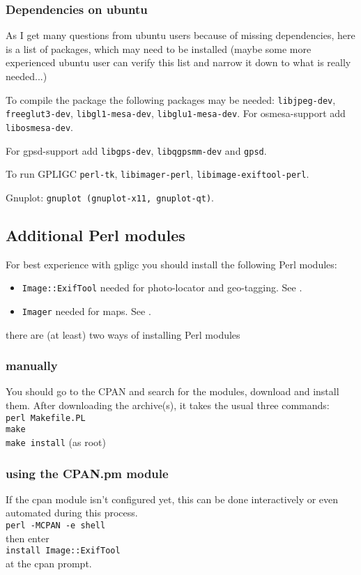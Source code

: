\subsubsection{Dependencies on ubuntu}
As I get many questions from ubuntu users because of missing dependencies, here is a list of
packages, which may need to be installed (maybe some more experienced ubuntu user can verify this list and narrow it down to what is really needed...)

To compile the package the following packages may be needed:
\texttt{libjpeg-dev}, \texttt{freeglut3-dev},
\texttt{libgl1-mesa-dev},
\texttt{libglu1-mesa-dev}. For osmesa-support add \texttt{libosmesa-dev}.

For gpsd-support add \texttt{libgps-dev}, \texttt{libqgpsmm-dev} and \texttt{gpsd}.

To run GPLIGC \texttt{perl-tk}, \texttt{libimager-perl}, \texttt{libimage-exiftool-perl}.

Gnuplot: \texttt{gnuplot (gnuplot-x11, gnuplot-qt)}.


%




\subsection{Additional Perl modules}
For best experience with gpligc you should install the following Perl modules:\\

\begin{itemize}
 \item \texttt{Image::ExifTool} \quad needed for photo-locator and geo-tagging. See \cite{exiftool}.
 \item \texttt{Imager} \quad needed for maps. See \cite{imager}.
\end{itemize}

there are (at least) two ways of installing Perl modules

\subsubsection{manually} You should go to the CPAN \cite{cpan} and search for the modules, download and install them.
 After downloading the archive(s), it takes the usual three commands: \\
\texttt{perl Makefile.PL} \\
\texttt{make} \\
\texttt{make install}   (as root)\\


\subsubsection{using the CPAN.pm module} If the cpan module isn't configured yet, this can be done interactively or even automated during this process. \\
\texttt{perl -MCPAN -e shell} \\
then enter \\
\texttt{install Image::ExifTool}\\
at the cpan prompt.
